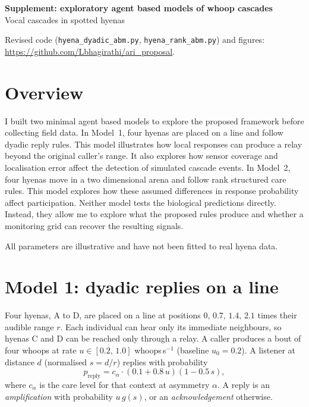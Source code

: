 \documentclass[11pt,a4paper]{article}
\begin{document}
\begin{center}
{\Large\bfseries Supplement: exploratory agent based models of whoop cascades}\\[4pt]
{\normalsize Vocal cascades in spotted hyenas}
\end{center}
\vspace{-6pt}

Revised code (\texttt{hyena\_dyadic\_abm.py}, \texttt{hyena\_rank\_abm.py}) and figures:
\url{https://github.com/Lbhagirathi/ari_proposal}.

\section*{Overview}

I built two minimal agent based models to explore the proposed framework before
collecting field data. In Model~1, four hyenas are placed on a line and follow dyadic
reply rules. This model illustrates how local responses can produce a relay beyond
the original caller's range. It also explores how sensor coverage and localisation
error affect the detection of simulated cascade events. In Model~2, four hyenas move
in a two dimensional arena and follow rank structured care rules. This model explores
how these assumed differences in response probability affect participation. Neither
model tests the biological predictions directly. Instead, they allow me to explore
what the proposed rules produce and whether a monitoring grid can recover the
resulting signals.

All parameters are illustrative and have not been fitted to real hyena data.

\section*{Model 1: dyadic replies on a line}

Four hyenas, A to D, are placed on a line at positions $0,\,0.7,\,1.4,\,2.1$ times
their audible range $r$. Each individual can hear only its immediate neighbours, so
hyenas C and D can be reached only through a relay. A caller produces a bout of four whoops at rate
$u \in [0.2,\,1.0]$ whoops\,s$^{-1}$ (baseline $u_0 = 0.2$). A listener at distance
$d$ (normalised $s = d/r$) replies with probability
\[
  p_{\text{reply}} = c_\alpha \cdot (0.1 + 0.8\,u)(1 - 0.5\,s),
\]
where $c_\alpha$ is the care level for that context at asymmetry $\alpha$.
A reply is an \emph{amplification} with probability $u\,g(s)$, or an
\emph{acknowledgement} otherwise.
\end{document}
